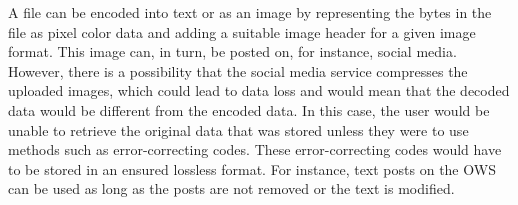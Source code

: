 A file can be encoded into text or as an image by representing the bytes in the file as pixel color data and adding a suitable image header for a given image format. This image can, in turn, be posted on, for instance, social media. However, there is a possibility that the social media service compresses the uploaded images, which could lead to data loss and would mean that the decoded data would be different from the encoded data. In this case, the user would be unable to retrieve the original data that was stored unless they were to use methods such as \mbox{error-correcting} codes. These \mbox{error-correcting} codes would have to be stored in an ensured lossless format. For instance, text posts on the \gls{OWS} can be used as long as the posts are not removed or the text is modified.